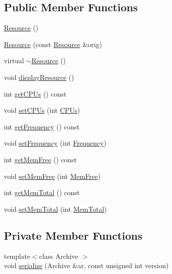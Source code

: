 \subsection*{Public Member Functions}
\begin{DoxyCompactItemize}
\item 
\hyperlink{classrdf_1_1Resource_a6429643c9dc30ee324e10230203bfc19}{Resource} ()
\item 
\hyperlink{classrdf_1_1Resource_a05795b56fdd9f7850faaa26db68da378}{Resource} (const \hyperlink{classrdf_1_1Resource}{Resource} \&orig)
\item 
virtual \hyperlink{classrdf_1_1Resource_a1172ca19c641a1cdef69dadfbd71e135}{$\sim$\+Resource} ()
\item 
void \hyperlink{classrdf_1_1Resource_a494a37b398f88c9180215f7d2a56104a}{display\+Resource} ()
\item 
int \hyperlink{classrdf_1_1Resource_ad1d552c80195c2d60054bcb7aed1c3a0}{get\+C\+P\+Us} () const 
\item 
void \hyperlink{classrdf_1_1Resource_acde532c88486296bea5ae2420a981364}{set\+C\+P\+Us} (int \hyperlink{classrdf_1_1Resource_aa26913be707d9845b9c3ba180febe043}{C\+P\+Us})
\item 
int \hyperlink{classrdf_1_1Resource_adf18e6ac1a7707277a3dbc322acd082a}{get\+Frequency} () const 
\item 
void \hyperlink{classrdf_1_1Resource_a41df357db31501e5dbc0e78d347efc3e}{set\+Frequency} (int \hyperlink{classrdf_1_1Resource_ab5f7c94360292b32006f95e4a718decb}{Frequency})
\item 
int \hyperlink{classrdf_1_1Resource_a776692d45e08c13c1d3cbd8ef7ce9c5b}{get\+Mem\+Free} () const 
\item 
void \hyperlink{classrdf_1_1Resource_a91e688e3f3ea4ccd462887b687f7b14c}{set\+Mem\+Free} (int \hyperlink{classrdf_1_1Resource_a6fa4758d8e1cbc6315073e204bfcae7a}{Mem\+Free})
\item 
int \hyperlink{classrdf_1_1Resource_a6b082c36d255a097879d81ee347145a5}{get\+Mem\+Total} () const 
\item 
void \hyperlink{classrdf_1_1Resource_a316a34c2dd6758f3125e7f424b3f35ba}{set\+Mem\+Total} (int \hyperlink{classrdf_1_1Resource_a37ff1f3b7071c2cdd5dcfa39ed0c7174}{Mem\+Total})
\end{DoxyCompactItemize}
\subsection*{Private Member Functions}
\begin{DoxyCompactItemize}
\item 
{\footnotesize template$<$class Archive $>$ }\\void \hyperlink{classrdf_1_1Resource_adfedf0fbbd8025004e21d87d46dc7abf}{serialize} (Archive \&ar, const unsigned int version)
\end{DoxyCompactItemize}
